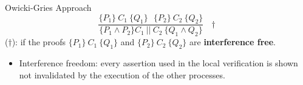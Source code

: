 \documentclass[11pt]{beamer}
\begin{document}
\begin{frame}{Owicki-Gries Approach}
  $$\frac{\{P_1\}~C_1~\{Q_1\}~~~\{P_2\}~C_2~\{Q_2\}}{\{P_1 \land P_2\}
    C_1~||~C_2~\{Q_1 \land Q_2\}}~~~\dagger $$
  ($\dagger$): if the proofs $\{P_1\}~C_1~\{Q_1\}$ and $\{P_2\}~C_2~\{Q_2\}$ are {\bf interference free}.
  \pause

  \begin{itemize}
\item Interference freedom: every assertion used in the local verification is
  shown not invalidated by the execution of the other processes.
\end{itemize}
\end{frame}
\end{document}
